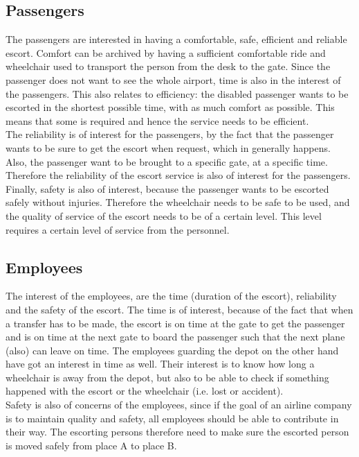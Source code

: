 \documentclass[a4paper, 11pt, notitlepage]{report}
\begin{document}
\subsection{Passengers}
The passengers are interested in having a comfortable, safe, efficient and reliable escort. Comfort can be archived by having a sufficient comfortable ride and wheelchair used to transport the person from the desk to the gate. Since the passenger does not want to see the whole airport,  time is also in the interest of the passengers. This also relates to efficiency: the disabled passenger wants to be escorted in the shortest possible time, with as much comfort as possible. This means that some  is required and hence the service needs to be efficient. \\
The reliability is of interest for the passengers, by the fact that
the passenger wants to be sure to get the escort when request, which in generally happens. Also, the passenger want to be brought to a specific gate, at a specific time. Therefore the reliability of the escort service is also of interest for the passengers.\\
Finally, safety is also of interest, because the passenger wants to be escorted safely without injuries. Therefore the wheelchair needs to be safe to be used, and the quality of service of the escort needs to be of a certain level. This level requires a certain level of service from the personnel.
\subsection{Employees}
The interest of the employees, are the time (duration of the escort), reliability and the safety of the escort. The time is of interest, because of the fact that when a transfer has to be made, the escort is on time at the gate to get the passenger and is on time at the next gate to board the passenger such that the next plane (also) can leave on time. The employees guarding the depot on the other hand have got an interest in time as well. Their interest is to know how long a wheelchair is away from the depot, but also to be able to check if something happened with the escort or the wheelchair (i.e. lost or accident). \\
Safety is also of concerns of the employees, since if the goal of an airline company is to maintain quality and safety, all employees should be able to contribute in their way. The escorting persons therefore need to make sure the escorted person is moved safely from place A to place B.
\end{document}
